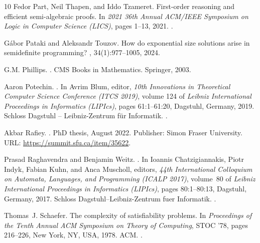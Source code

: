 \documentclass[11pt]{article}
\newcommand{\1}{\textbf{1}}
\begin{document}
\begin{thebibliography}{10}
Fedor Part, Neil Thapen, and Iddo Tzameret.
\newblock First-order reasoning and efficient semi-algebraic proofs.
\newblock In {\em 2021 36th Annual ACM/IEEE Symposium on Logic in Computer Science (LICS)}, pages 1--13, 2021.
\newblock \href {https://doi.org/10.1109/LICS52264.2021.9470546} {}.

G\'{a}bor Pataki and Aleksandr Touzov.
\newblock How do exponential size solutions arise in semidefinite programming?
, 34(1):977--1005, 2024.

G.M. Phillips.
.
\newblock CMS Books in Mathematics. Springer, 2003.

Aaron Potechin.
.
\newblock In Avrim Blum, editor, {\em 10th Innovations in Theoretical Computer Science Conference (ITCS 2019)}, volume 124 of {\em Leibniz International Proceedings in Informatics (LIPIcs)}, pages 61:1--61:20, Dagstuhl, Germany, 2019. Schloss Dagstuhl -- Leibniz-Zentrum f{\"u}r Informatik.
\newblock \href {https://doi.org/10.4230/LIPIcs.ITCS.2019.61} {}.

Akbar Rafiey.
.
\newblock PhD thesis, August 2022.
\newblock Publisher: Simon Fraser University.
\newblock URL: \url{https://summit.sfu.ca/item/35622}.

Prasad Raghavendra and Benjamin Weitz.
.
\newblock In Ioannis Chatzigiannakis, Piotr Indyk, Fabian Kuhn, and Anca Muscholl, editors, {\em 44th International Colloquium on Automata, Languages, and Programming (ICALP 2017)}, volume~80 of {\em Leibniz International Proceedings in Informatics (LIPIcs)}, pages 80:1--80:13, Dagstuhl, Germany, 2017. Schloss Dagstuhl--Leibniz-Zentrum fuer Informatik.
\newblock \href {https://doi.org/10.4230/LIPIcs.ICALP.2017.80} {}.

Thomas~J. Schaefer.
\newblock The complexity of satisfiability problems.
\newblock In {\em Proceedings of the Tenth Annual ACM Symposium on Theory of Computing}, STOC '78, pages 216--226, New York, NY, USA, 1978. ACM.
\newblock \href {https://doi.org/10.1145/800133.804350} {}.


\end{thebibliography}
\end{document}
